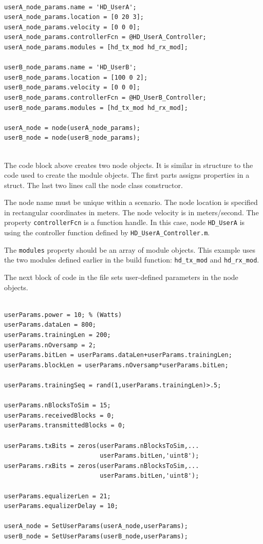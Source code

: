 \begin{lstlisting}[name=hdBuildNodes]
% Define nodes

userA_node_params.name = 'HD_UserA';
userA_node_params.location = [0 20 3];
userA_node_params.velocity = [0 0 0];
userA_node_params.controllerFcn = @HD_UserA_Controller;
userA_node_params.modules = [hd_tx_mod hd_rx_mod];

userB_node_params.name = 'HD_UserB';
userB_node_params.location = [100 0 2];
userB_node_params.velocity = [0 0 0];
userB_node_params.controllerFcn = @HD_UserB_Controller;
userB_node_params.modules = [hd_tx_mod hd_rx_mod];

userA_node = node(userA_node_params);
userB_node = node(userB_node_params);


\end{lstlisting}

The code block above creates two node objects.  It is similar in
structure to the code used to create the module objects. The first
parts assigns properties in a struct.  The last two lines call the
node class constructor.

The node name must be unique within a scenario.  The node location
is specified in rectangular coordinates in meters.  The node
velocity is in meters/second.  The property \verb+controllerFcn+ is
a function handle. In this case, node \verb+HD_UserA+ is using the
controller function defined by \verb+HD_UserA_Controller.m+.

The \verb+modules+ property should be an array of module objects.
This example uses the two modules defined earlier in the build
function: \verb+hd_tx_mod+ and \verb+hd_rx_mod+.

The next block of code in the file sets user-defined parameters in
the node objects.

\begin{lstlisting}[name=hdBuildNodes]
% Set user parameters

userParams.power = 10; % (Watts)
userParams.dataLen = 800;
userParams.trainingLen = 200;
userParams.nOversamp = 2;
userParams.bitLen = userParams.dataLen+userParams.trainingLen;
userParams.blockLen = userParams.nOversamp*userParams.bitLen;

userParams.trainingSeq = rand(1,userParams.trainingLen)>.5;

userParams.nBlocksToSim = 15;
userParams.receivedBlocks = 0;
userParams.transmittedBlocks = 0;

userParams.txBits = zeros(userParams.nBlocksToSim,...
                          userParams.bitLen,'uint8');
userParams.rxBits = zeros(userParams.nBlocksToSim,...
                          userParams.bitLen,'uint8');

userParams.equalizerLen = 21;
userParams.equalizerDelay = 10;

userA_node = SetUserParams(userA_node,userParams);
userB_node = SetUserParams(userB_node,userParams);


\end{lstlisting}

